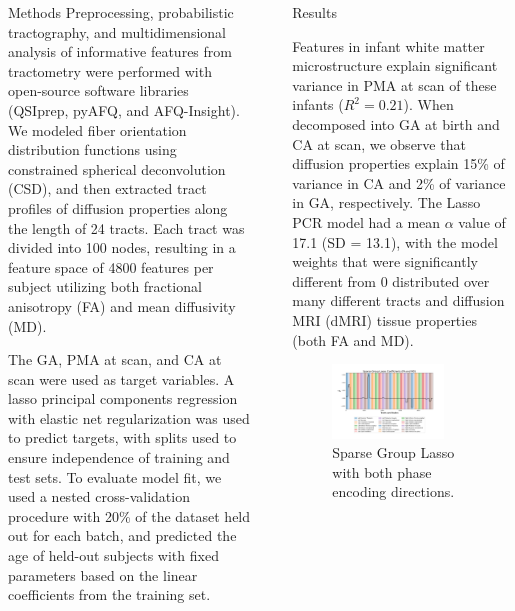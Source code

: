 \documentclass[final]{beamer}
\newlength{\sepwidth}
\newlength{\colwidth}
\newcommand{\separatorcolumn}{\begin{column}{\sepwidth}\end{column}}
\begin{document}
\begin{frame}[t]
\begin{columns}[t]
\begin{column}{\colwidth}
\begin{block}{Methods}
    Preprocessing, probabilistic tractography, and multidimensional analysis of informative features from tractometry were performed with open-source software libraries (QSIprep, pyAFQ, and AFQ-Insight). We modeled fiber orientation distribution functions using constrained spherical deconvolution (CSD), and then extracted tract profiles of diffusion properties along the length of 24 tracts. Each tract was divided into 100 nodes, resulting in a feature space of 4800 features per subject utilizing both fractional anisotropy (FA) and mean diffusivity (MD). 

    The GA, PMA at scan, and CA at scan were used as target variables. A lasso principal components regression with elastic net regularization was used to predict targets, with splits used to ensure independence of training and test sets. To evaluate model fit, we used a nested cross-validation procedure with 20\% of the dataset held out for each batch, and predicted the age of held-out subjects with fixed parameters based on the linear coefficients from the training set.

  \end{block}

\end{column}

\separatorcolumn

\begin{column}{\colwidth}

  \begin{block}{Results}

    Features in infant white matter microstructure explain significant variance in PMA at scan of these infants ($R^2 = 0.21$). When decomposed into GA at birth and CA at scan, we observe that diffusion properties explain 15\% of variance in CA and 2\% of variance in GA, respectively. The Lasso PCR model had a mean $\alpha$ value of 17.1 (SD = 13.1), with the model weights that were significantly different from 0 distributed over many different tracts and diffusion MRI (dMRI) tissue properties (both FA and MD).

    \begin{figure}
      \centering
      \includegraphics[trim=10 20 10 20,clip,width=0.8\textwidth]{sgl.jpg}
      \caption{Sparse Group Lasso with both phase encoding directions.}
    \end{figure}


\end{block}
\end{column}
\end{columns}
\end{frame}
\end{document}
